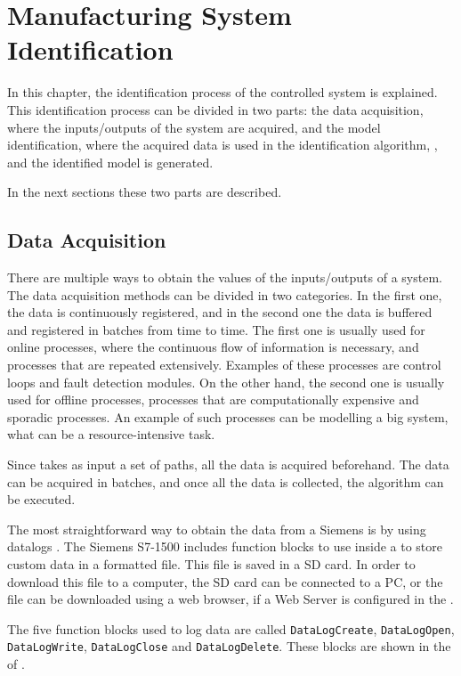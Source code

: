 
\chapter{Manufacturing System Identification}
\label{cha:ident}
In this chapter, the identification process of the controlled system is
explained. This identification process can be divided in two parts: the data acquisition, where the inputs\slash outputs of the system are
  acquired, and the model identification, where the acquired data is
  used in the identification algorithm, , and the
  identified model is generated.
 
In the next sections these two parts are described.

\section{Data Acquisition}
There are multiple ways to obtain the values of the
inputs\slash outputs of a system. The data acquisition methods can be divided in two categories. In the first one,
the data is continuously registered, and in the second one the data is buffered
and registered in batches from time to time.
The first one is usually used for online processes, where the continuous flow of
information is necessary, and processes that are repeated
extensively. Examples of these processes are control loops and fault
detection modules. On the other hand, the second one is usually used for offline
processes, processes that are computationally expensive and sporadic processes.
An example of such processes can be modelling a big system, what can be a
resource-intensive task.

Since  takes as input a set of paths, all the data is
acquired beforehand. The data can
be acquired in batches, and once all the data is collected, the algorithm can be
executed.

The most straightforward way to obtain the data from a Siemens \PLC{} is by
using datalogs \citep{datalogSiemens}. The Siemens \PLC{} S7-1500 includes function blocks to
use inside a \LD{} to store custom data in a \CSV{} formatted file. This file is
saved in a SD card. In order to download this file to a computer, the SD card can be connected to a PC,
or the file can be downloaded using a web browser, if a Web Server is configured in the
\PLC.

The five function blocks used to log data are called
\texttt{DataLogCreate},
\texttt{DataLogOpen}, \texttt{DataLogWrite}, \texttt{DataLogClose} and \texttt{DataLogDelete}.
These blocks are shown in the \LD{} of .

